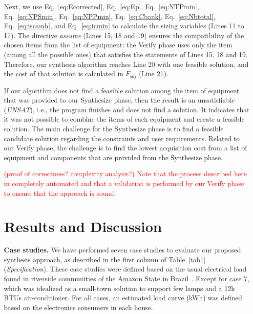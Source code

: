 \documentclass[runningheads]{llncs}
\begin{document}
Next, we use Eq.~\ref{eq:Ecorrected}, Eq.~\ref{eq:Ep}, Eq.~\ref{eq:NTPmin}, Eq.~\ref{eq:NPSmin}, Eq.~\ref{eq:NPPmin}, Eq.~\ref{eq:Cbank}, Eq.~\ref{eq:Nbtotal}, Eq.~\ref{eq:iscamb}, and Eq.~\ref{eq:icmin} to calculate the sizing variables (Lines 11 to 17). The directive \textit{assume} (Lines 15, 18 and 19) ensures the compatibility of the chosen items from the list of equipment: the {\sc Verify} phase uses only the item (among all the possible ones) that satisfies the statements of Lines 15, 18 and 19. Therefore, our synthesis algorithm reaches Line 20 with one feasible solution, and the cost of that solution is calculated in $F_{obj}$ (Line 21). 

If our algorithm does not find a feasible solution among the item of equipment that was provided to our {\sc Synthesize} phase, then the result is an unsatisfiable (\textit{UNSAT}), i.e., the program finishes and does not find a solution. It indicates that it was not possible to combine the items of each equipment and create a feasible solution. The main challenge for the {\sc Synthesize} phase is to find a feasible candidate solution regarding the constraints and user requirements. Related to our {\sc Verify} phase, the challenge is to find the lowest acquisition cost from a list of equipment and components that are provided from the {\sc Synthesize} phase. 

\textcolor{red}{(proof of correctness? complexity analysis?)
Note that the process described here in completely automated and that a validation is performed by our {\sc Verify} phase to ensure that the approach is sound.}
\section{Results and Discussion}

\textbf{Case studies.} We have performed seven case studies to evaluate our proposed synthesis approach, as described in the first column of Table~\ref{tab1} 
(\textit{Specification}). These case studies were defined based on the usual electrical load found in riverside communities of the Amazon State in Brazil~\cite{Agrener2013,TrindadeCordeiro19}. Except for case 7, which was idealized as a small-town solution to support few lamps and a 12k BTUs air-conditioner. For all cases, an estimated load curve (kWh) was defined based on the electronics consumers in each house.
\end{document}

